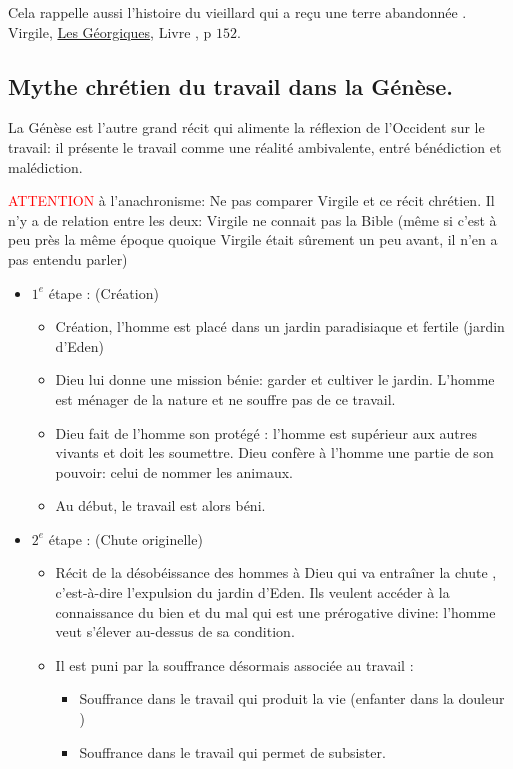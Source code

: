 \documentclass[a4paper, 11pt, hidelinks]{article}
\newcommand{\bs}{\bigskip}
\newcommand{\rb}[1]{\Romanbar{#1}}
\begin{document}
\bs

Cela rappelle aussi l'histoire du vieillard qui a reçu une terre \og abandonnée \fg. Virgile, \underline{Les Géorgiques}, Livre \rb{4}, p $152$.

\subsection{Mythe chrétien du travail dans la Génèse.}


La Génèse est l'autre grand récit qui alimente la réflexion de l'Occident sur le travail: il présente le travail comme une réalité
ambivalente, entré bénédiction et malédiction.


\textcolor{red}{ATTENTION} à l'anachronisme: Ne pas comparer Virgile et ce récit chrétien. Il n'y a de relation entre les deux: Virgile ne 
connait pas la Bible (même si c'est à peu près la même époque quoique Virgile était sûrement un peu avant, il n'en a pas entendu parler)


\begin{itemize}
    \item $1^e$ étape : (Création)
    \begin{itemize}
        \item Création, l'homme est placé dans un jardin paradisiaque et fertile (jardin d'Eden)
        \item Dieu lui donne une mission bénie: \og garder et cultiver \fg le jardin. L'homme est ménager
        de la nature et ne souffre pas de ce travail.
        \item Dieu fait de l'homme son \og protégé \fg : l'homme est supérieur aux autres vivants et doit les 
        soumettre. Dieu confère à l'homme une partie de son pouvoir: celui de nommer les animaux.
        \item Au début, le travail est alors béni.
    \end{itemize}
    \item $2^e$ étape : (Chute originelle)
    \begin{itemize}
        \item Récit de la désobéissance des hommes à Dieu qui va entraîner la \og chute \fg, c'est-à-dire l'expulsion du jardin d'Eden.
        Ils veulent accéder à la connaissance du bien et du mal qui est une prérogative divine: l'homme veut s'élever au-dessus de sa condition.
        \item Il est puni par la souffrance désormais associée au travail : 
        \begin{itemize}
            \item Souffrance dans le travail qui produit la vie (\og enfanter dans la douleur \fg)
            \item Souffrance dans le travail qui permet de subsister.
        \end{itemize}
    \end{itemize}
\end{itemize}
\end{document}
